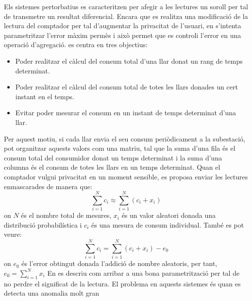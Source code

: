
Els sistemes pertorbatius es caracteritzen per afegir a les lectures un soroll per tal de transmetre un resultat diferencial. Encara que es realitza una modificació de la lectura del comptador per tal d'augmentar la privacitat de l'usuari, en \cite{smart-grid-technique} s'intenta parametritzar l'error màxim permès i això permet que es controli l'error en una operació d'agregació. \cite{smart-grid-technique} es centra en tres objectius:
\begin{itemize}
	\item Poder realitzar el càlcul del consum total d'una llar donat un rang de temps determinat.
	\item Poder realitzar el càlcul del consum total de totes les llars donades un cert instant en el temps.
	\item Evitar poder mesurar el consum en un instant de temps determinat d'una llar.
\end{itemize}
Per aquest motiu, si cada llar envia el seu consum periòdicament a la subestació, pot organitzar aquests valors com una matriu, tal que la suma d'una fila és el consum total del consumidor donat un temps determinat i la suma d'una columna és el consum de totes les llars en un temps determinat. Quan el comptador vulgui privacitat en un moment sensible, es proposa enviar les lectures enmascarades de manera que:
\[\sum_{i=1}^{N} c_i \approx \sum_{i=1}^{N} (c_i + x_i)\]
on $N$ és el nombre total de mesures, $x_i$ és un valor aleatori donada una distribució probabilística i $c_i$ és una mesura de consum individual. També es pot veure:
\[\sum_{i=1}^{N} c_i = \sum_{i=1}^{N} (c_i + x_i) - e_0\]
on $e_0$ és l'error obtingut donada l'addició de nombre aleatoris, per tant, $e_0 = \sum_{i=1}^{N}x_i$
En \cite{smart-grid-technique} es descriu com arribar a una bona parametrització per tal de no perdre el significat de la lectura. El problema en aquests sistemes és quan es detecta una anomalia molt gran 
